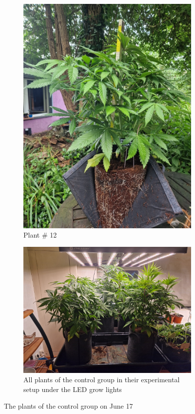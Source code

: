 \begin{figure}[htbp]
\begin{subfigure}[t]{.28\textwidth}
        \includegraphics[width=\linewidth]{plant_12_2024-06-17}
        \caption{Plant \# 12}
        \label{fig:plant_12_2024-06-17}
    \end{subfigure}
    \begin{subfigure}[t]{.85\textwidth}
        \includegraphics[width=\linewidth]{plant_ctrl_2024-06-17}
        \caption{All plants of the control group in their experimental setup under the LED grow lights}
        \label{fig:plant_ctrl_2024-06-17}
    \end{subfigure}
    \caption[Plants of the control group on June 17]{The plants of the control group on June 17}
    \label{fig:plants_ctrl_2024-06-17}
\end{figure}

